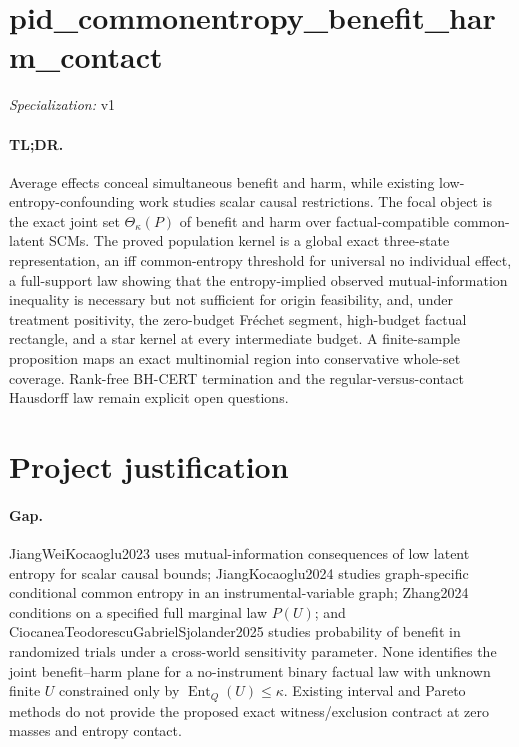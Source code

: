 \documentclass{article}
\begin{document}
\sloppy

\section*{pid\_\allowbreak{}commonentropy\_\allowbreak{}benefit\_\allowbreak{}harm\_\allowbreak{}contact}

\noindent\textit{Specialization:} v1\par

\paragraph{TL;DR.} Average effects conceal simultaneous benefit and harm, while existing low-entropy-confounding work studies scalar causal restrictions. The focal object is the exact joint set \(\Theta_\kappa(P)\) of benefit and harm over factual-compatible common-latent SCMs. The proved population kernel is a global exact three-state representation, an iff common-entropy threshold for universal no individual effect, a full-support law showing that the entropy-implied observed mutual-information inequality is necessary but not sufficient for origin feasibility, and, under treatment positivity, the zero-budget Fréchet segment, high-budget factual rectangle, and a star kernel at every intermediate budget. A finite-sample proposition maps an exact multinomial region into conservative whole-set coverage. Rank-free BH-CERT termination and the regular-versus-contact Hausdorff law remain explicit open questions.

\section{Project justification}

\paragraph{Gap.} JiangWeiKocaoglu2023 uses mutual-information consequences of low latent entropy for scalar causal bounds; JiangKocaoglu2024 studies graph-specific conditional common entropy in an instrumental-variable graph; Zhang2024 conditions on a specified full marginal law \(P(U)\); and CiocaneaTeodorescuGabrielSjolander2025 studies probability of benefit in randomized trials under a cross-world sensitivity parameter. None identifies the joint benefit--harm plane for a no-instrument binary factual law with unknown finite \(U\) constrained only by \(\operatorname{Ent}_Q(U)\leq\kappa\). Existing interval and Pareto methods do not provide the proposed exact witness/exclusion contract at zero masses and entropy contact.
\end{document}
